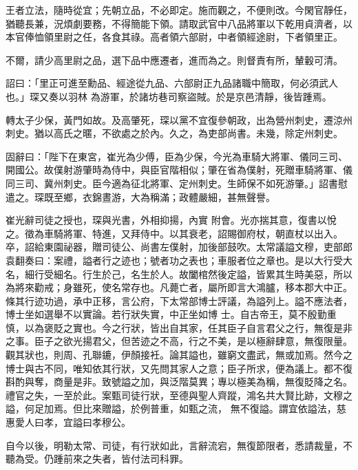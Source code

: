 \begin{pinyinscope}
 王者立法，隨時從宜；先朝立品，不必即定。施而觀之，不便則改。今閑官靜任，猶聽長兼，況煩劇要務，不得簡能下領。請取武官中八品將軍以下乾用貞濟者，以本官俸恤領里尉之任，各食其祿。高者領六部尉，中者領經途尉，下者領里正。



 不爾，請少高里尉之品，選下品中應遷者，進而為之。則督責有所，輦轂可清。



 詔曰：「里正可進至勳品、經途從九品、六部尉正九品諸職中簡取，何必須武人也。」琛又奏以羽林
 為游軍，於諸坊巷司察盜賊。於是京邑清靜，後皆踵焉。



 轉太子少保，黃門如故。及高肇死，琛以黨不宜復參朝政，出為營州刺史，遷涼州刺史。猶以高氏之暱，不欲處之於內。久之，為吏部尚書。未幾，除定州刺史。



 固辭曰：「陛下在東宮，崔光為少傅，臣為少保，今光為車騎大將軍、儀同三司、開國公。故僕射游肇時為侍中，與臣官階相似；肇在省為僕射，死贈車騎將軍、儀同三司、冀州刺史。臣今適為征北將軍、定州刺史。生師保不如死游肇。」詔書慰遣之。琛既至鄉，衣錦晝游，大為稱滿；政體嚴細，甚無聲譽。



 崔光辭司徒之授也，琛與光書，外相抑揚，內實
 附會。光亦揣其意，復書以悅之。徵為車騎將軍、特進，又拜侍中。以其衰老，詔賜御府杖，朝直杖以出入。卒，詔給東園祕器，贈司徒公、尚書左僕射，加後部鼓吹。太常議謚文穆，吏部郎袁翻奏曰：案禮，謚者行之迹也；號者功之表也；車服者位之章也。是以大行受大名，細行受細名。行生於己，名生於人。故闔棺然後定謚，皆累其生時美惡，所以為將來勸戒；身雖死，使名常存也。凡薨亡者，屬所即言大鴻臚，移本郡大中正。條其行迹功過，承中正移，言公府，下太常部博士評議，為謚列上。謚不應法者，博士坐如選舉不以實論。若行狀失實，中正坐如博
 士。自古帝王，莫不殷勤重慎，以為褒貶之實也。今之行狀，皆出自其家，任其臣子自言君父之行，無復是非之事。臣子之欲光揚君父，但苦迹之不高，行之不美，是以極辭肆意，無復限量。觀其狀也，則周、孔聯鏕，伊顏接衽。論其謚也，雖窮文盡武，無或加焉。然今之博士與古不同，唯知依其行狀，又先問其家人之意；臣子所求，便為議上。都不復斟酌與奪，商量是非。致號謚之加，與泛階莫異；專以極美為稱，無復貶降之名。禮官之失，一至於此。案甄司徒行狀，至德與聖人齊蹤，鴻名共大賢比跡，文穆之謚，何足加焉。但比來贈謚，於例普重，如甄之流，
 無不復謚。謂宜依謚法，慈惠愛人曰孝，宜謚曰孝穆公。



 自今以後，明勒太常、司徒，有行狀如此，言辭流宕，無復節限者，悉請裁量，不聽為受。仍踵前來之失者，皆付法司科罪。




\end{pinyinscope}

